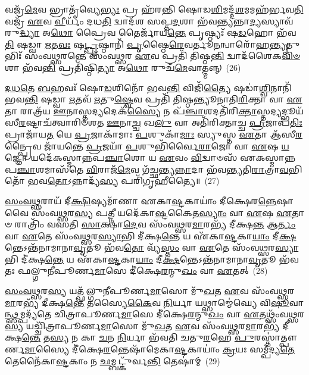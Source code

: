 𑌵𑌜𑍍𑌰᳴\-\ul{𑌮𑍇}\-𑌵 𑌭𑍍𑌰𑌾𑌤𑍃᳴𑌵𑍍𑌯𑍇\-\ul{𑌭𑍍𑌯𑌃} 𑌪𑍍𑌰 𑌹᳴𑌰𑌨𑍍𑌤𑌿 𑌷𑍋𑌡\-\ul{𑌶𑌿}\-𑌮𑌦𑍍𑌦᳴\-\ul{𑌶}\-𑌮𑌮𑌹᳴𑌰𑍍𑌭𑌵\-\ul{𑌤𑌿} 𑌵𑌜𑍍𑌰᳴ \ul{𑌏}\-𑌵 \ul{𑌵𑍀}\-𑌰𑍍𑌯𑌂᳴ 𑌦𑌧\-\ul{𑌤𑌿} 𑌦𑍍𑌵𑌾𑌦᳴𑌶 𑌸𑌪𑍍𑌤\-\ul{𑌦}\-𑌶𑌾 𑌭᳴𑌵\-\ul{𑌨𑍍𑌤𑍍𑌯}\-𑌨𑍍𑌨𑌾\-\ul{𑌦𑍍𑌯}\-𑌸𑍍𑌯𑌾𑌵᳴𑌰𑍁\-\ul{𑌦𑍍𑌧𑍍𑌯𑌾} 𑌅\-\ul{𑌥𑍋} 𑌪𑍍𑌰𑍈𑌵 𑌤𑍈𑌰𑍍𑌜𑌾᳴𑌯\-\ul{𑌨𑍍𑌤𑍇} 𑌪𑍃𑌷𑍍𑌠𑍍𑌯𑌃᳴ 𑌷\-\ul{𑌡}\-𑌹𑍋 𑌭᳴𑌵\-\ul{𑌤𑌿} 𑌷𑌡𑍍𑌵𑌾 \ul{𑌋}\-𑌤\-\ul{𑌵𑌃} 𑌷\-\ul{𑌟𑍍𑌪𑍃}\-𑌷𑍍𑌠𑌾𑌨𑌿᳴ \ul{𑌪𑍃}\-𑌷𑍍𑌠𑍈\-\ul{𑌰𑍇}\-𑌵𑌰𑍍𑌤𑍂\-\ul{𑌨}\-𑌨𑍍𑌵𑌾𑌰𑍋᳴𑌹\-\ul{𑌨𑍍𑌤𑍍𑌯𑍃}\-𑌤𑍁𑌭𑌿𑌃᳴ 𑌸𑌂𑌵\-\ul{𑌥𑍍𑌸}\-𑌰𑌨𑍍𑌤𑍇 𑌸𑌂᳴𑌵\-\ul{𑌥𑍍𑌸}\-𑌰 \ul{𑌏}\-𑌵 𑌪𑍍𑌰𑌤𑌿᳴ 𑌤𑌿𑌷𑍍𑌠\-\ul{𑌨𑍍𑌤𑌿} 𑌦𑍍𑌵𑌾𑌦᳴𑌶𑍈𑌕\-\ul{𑌵𑌿}\-\-\ul{𑍞}\-𑌶𑌾 𑌭᳴𑌵\-\ul{𑌨𑍍𑌤𑌿} 𑌪𑍍𑌰𑌤𑌿᳴𑌷𑍍𑌠𑌿\-\ul{𑌤𑍍𑌯𑌾} 𑌅\-\ul{𑌥𑍋} 𑌰𑍁𑌚᳴\-\ul{𑌮𑍇}\-𑌵𑌾𑌤𑍍𑌮𑌨𑍍𑌨𑍍~(26)

\-\ul{𑌦}\-\-\ul{𑌧}\-\-\ul{𑌤𑍇} \ul{𑌬}\-𑌹𑌵𑌃᳴ 𑌷𑍋\-\ul{𑌡}\-𑌶𑌿𑌨𑍋᳴ 𑌭𑌵\-\ul{𑌨𑍍𑌤𑌿} 𑌵𑌿𑌜𑌿᳴\-\ul{𑌤𑍍𑌯𑍈} 𑌷𑌡𑌾॑\-\ul{𑌶𑍍𑌵𑌿}\-𑌨𑌾𑌨𑌿᳴ 𑌭𑌵\-\ul{𑌨𑍍𑌤𑌿} 𑌷𑌡𑍍𑌵𑌾 \ul{𑌋}\-𑌤𑌵᳴ \ul{𑌋}\-𑌤𑍁\-\ul{𑌷𑍍𑌵𑍇}\-𑌵 𑌪𑍍𑌰𑌤𑌿᳴ 𑌤𑌿𑌷𑍍𑌠𑌨𑍍𑌤𑍍𑌯𑍂𑌨𑌾𑌤𑌿\-\ul{𑌰𑌿}\-𑌕𑍍𑌤𑌾 𑌵𑌾 \ul{𑌏}\-𑌤𑌾 𑌰𑌾𑌤𑍍𑌰᳴𑌯 \ul{𑌊}\-𑌨𑌾𑌸𑍍𑌤𑌦𑍍𑌯𑌦𑍇𑌕᳴\-\ul{𑌸𑍍𑌯𑍈} 𑌨 𑌪᳴\-\ul{𑌞𑍍𑌚𑌾}\-𑌶𑌦𑌤𑌿᳴𑌰𑌿\-\ul{𑌕𑍍𑌤𑌾}\-𑌸𑍍𑌤𑌦𑍍𑌯𑌦𑍍𑌭𑍂𑌯᳴𑌸𑍀\-\ul{𑌰}\-𑌷𑍍𑌟𑌾𑌚᳴𑌤𑍍𑌵𑌾𑌰𑌿𑍞𑌶𑌤 \ul{𑌊}\-𑌨𑌾\-\ul{𑌚𑍍𑌚} 𑌖\-\ul{𑌲𑍁} 𑌵𑌾 𑌅𑌤𑌿᳴𑌰𑌿𑌕𑍍𑌤𑌾𑌚𑍍𑌚 \ul{𑌪𑍍𑌰}\-𑌜𑌾𑌪᳴\-\ul{𑌤𑌿𑌃} 𑌪𑍍𑌰𑌾𑌜𑌾᳴𑌯\-\ul{𑌤} 𑌯𑍇 \ul{𑌪𑍍𑌰}\-𑌜𑌾𑌕𑌾᳴𑌮𑌾𑌃 \ul{𑌪}\-𑌶𑍁𑌕𑌾᳴\-\ul{𑌮𑌾𑌃} 𑌸𑍍𑌯𑍁𑌸𑍍𑌤 \ul{𑌏}\-𑌤𑌾 𑌆᳴𑌸𑍀\-\ul{𑌰}\-𑌨𑍍𑌪𑍍𑌰𑍈𑌵 𑌜𑌾᳴𑌯𑌨𑍍𑌤𑍇 \ul{𑌪𑍍𑌰}\-𑌜𑌯𑌾᳴ \ul{𑌪}\-𑌶𑍁𑌭𑌿᳴𑌰𑍍𑌵𑍈\-\ul{𑌰𑌾}\-𑌜𑍋 𑌵𑌾 \ul{𑌏}\-𑌷 \ul{𑌯}\-𑌜𑍍𑌞𑍋 𑌯𑌦𑍇᳴𑌕𑌸𑍍𑌮𑌾𑌨𑍍𑌨𑌪\-\ul{𑌞𑍍𑌚𑌾}\-𑌶𑍋 𑌯 \ul{𑌏}\-𑌵𑌂 \ul{𑌵𑌿}\-𑌦𑍍𑌵𑌾𑍞𑌸᳴ 𑌏𑌕𑌸𑍍𑌮𑌾𑌨𑍍𑌨𑌪\-\ul{𑌞𑍍𑌚𑌾}\-𑌶𑌮𑌾𑌸᳴𑌤𑍇 \ul{𑌵𑌿}\-𑌰𑌾𑌜᳴\-\ul{𑌮𑍇}\-𑌵 𑌗᳴𑌚𑍍𑌛𑌨𑍍𑌤𑍍𑌯\-\ul{𑌨𑍍𑌨𑌾}\-𑌦𑌾 𑌭᳴𑌵𑌨𑍍𑌤𑍍𑌯𑌤𑌿\-\ul{𑌰𑌾}\-𑌤𑍍𑌰𑌾\-\ul{𑌵}\-𑌭𑌿𑌤𑍋᳴ 𑌭𑌵\-\ul{𑌤𑍋}\-\-𑌽𑌨𑍍𑌨𑌾𑌦𑍍𑌯᳴\-\ul{𑌸𑍍𑌯} 𑌪𑌰𑌿᳴𑌗𑍃𑌹𑍀𑌤𑍍𑌯𑍈॥~(27)

{\anuvakamend[{𑌵𑌜𑍍𑌰᳴ \ul{𑌆}\-𑌤𑍍𑌮\-\ul{𑌨𑍍𑌪𑍍𑌰}\-𑌜\-\ul{𑌯𑌾} 𑌦𑍍𑌵𑌾𑌵𑌿𑍞᳴𑌶𑌤𑌿𑌶𑍍𑌚}]}%

\-\ul{𑌸𑌂}\-\-\ul{𑌵}\-\-\ul{𑌥𑍍𑌸}\-𑌰𑌾𑌯᳴ 𑌦𑍀\-\ul{𑌕𑍍𑌷𑌿}\-𑌷𑍍𑌯𑌮𑌾᳴𑌣𑌾 𑌏𑌕𑌾\-\ul{𑌷𑍍𑌟}\-𑌕𑌾𑌯𑌾𑌂॑ 𑌦𑍀𑌕𑍍𑌷𑍇𑌰\-\ul{𑌨𑍍𑌨𑍇}\-𑌷𑌾 𑌵𑍈 𑌸𑌂᳴𑌵\-\ul{𑌥𑍍𑌸}\-𑌰\-\ul{𑌸𑍍𑌯} 𑌪\-\ul{𑌤𑍍𑌨𑍀} 𑌯𑌦𑍇᳴𑌕𑌾\-\ul{𑌷𑍍𑌟}\-𑌕𑍈𑌤\-\ul{𑌸𑍍𑌯𑌾𑌂} 𑌵𑌾 \ul{𑌏}\-𑌷 \ul{𑌏}\-𑌤𑌾𑍞 𑌰𑌾𑌤𑍍𑌰𑌿𑌂᳴ 𑌵𑌸𑌤𑌿 \ul{𑌸𑌾}\-𑌕𑍍𑌷𑌾\-\ul{𑌦𑍇}\-𑌵 𑌸𑌂᳴𑌵\-\ul{𑌥𑍍𑌸}\-𑌰\-\ul{𑌮𑌾}\-𑌰𑌭𑍍𑌯᳴ 𑌦𑍀𑌕𑍍𑌷\-\ul{𑌨𑍍𑌤} 𑌆\-\ul{𑌰𑍍𑌤𑌂} 𑌵𑌾 \ul{𑌏}\-𑌤𑍇 𑌸𑌂᳴𑌵\-\ul{𑌥𑍍𑌸}\-𑌰\-\ul{𑌸𑍍𑌯𑌾}\-𑌭𑌿 𑌦𑍀॑𑌕𑍍𑌷\-\ul{𑌨𑍍𑌤𑍇} 𑌯 𑌏᳴𑌕𑌾\-\ul{𑌷𑍍𑌟}\-𑌕𑌾\-\ul{𑌯𑌾𑌂} 𑌦𑍀\-\ul{𑌕𑍍𑌷}\-𑌨𑍍𑌤𑍇\-𑌽𑌨𑍍𑌤᳴𑌨𑌾𑌮𑌾𑌨𑌾\-\ul{𑌵𑍃}\-𑌤𑍂 𑌭᳴𑌵\-\ul{𑌤𑍋} 𑌵𑍍𑌯᳴\-\ul{𑌸𑍍𑌤𑌂} 𑌵𑌾 \ul{𑌏}\-𑌤𑍇 𑌸𑌂᳴𑌵\-\ul{𑌥𑍍𑌸}\-𑌰\-\ul{𑌸𑍍𑌯𑌾}\-𑌭𑌿 𑌦𑍀॑𑌕𑍍𑌷\-\ul{𑌨𑍍𑌤𑍇} 𑌯 𑌏᳴𑌕𑌾\-\ul{𑌷𑍍𑌟}\-𑌕𑌾\-\ul{𑌯𑌾𑌂} 𑌦𑍀\-\ul{𑌕𑍍𑌷}\-𑌨𑍍𑌤𑍇\-𑌽𑌨𑍍𑌤᳴𑌨𑌾𑌮𑌾𑌨𑌾\-\ul{𑌵𑍃}\-𑌤𑍂 𑌭᳴𑌵𑌤𑌃 𑌫𑌲𑍍𑌗𑍁𑌨𑍀𑌪𑍂𑌰𑍍𑌣\-\ul{𑌮𑌾}\-𑌸𑍇 𑌦𑍀॑𑌕𑍍𑌷𑍇\-\ul{𑌰}\-𑌨𑍍𑌮𑍁\-\ul{𑌖𑌂} 𑌵𑌾 \ul{𑌏}\-𑌤𑌤𑍍~(28)

\-\ul{𑌸𑌂}\-\-\ul{𑌵}\-\-\ul{𑌥𑍍𑌸}\-𑌰\-\ul{𑌸𑍍𑌯} 𑌯𑌤𑍍𑌫᳴𑌲𑍍𑌗𑍁𑌨𑍀𑌪𑍂𑌰𑍍𑌣\-\ul{𑌮𑌾}\-𑌸𑍋 𑌮𑍁᳴\-\ul{𑌖}\-𑌤 \ul{𑌏}\-𑌵 𑌸𑌂᳴𑌵\-\ul{𑌥𑍍𑌸}\-𑌰\-\ul{𑌮𑌾}\-𑌰𑌭𑍍𑌯᳴ 𑌦𑍀𑌕𑍍𑌷\-\ul{𑌨𑍍𑌤𑍇} 𑌤𑌸𑍍𑌯𑍈\-\ul{𑌕𑍈}\-𑌵 \ul{𑌨𑌿}\-𑌰𑍍𑌯𑌾 𑌯𑌥𑍍𑌸𑌾𑌮𑍍𑌮𑍇॑𑌘𑍍𑌯𑍇 𑌵𑌿\-\ul{𑌷𑍂}\-𑌵𑌾\-\ul{𑌨𑍍𑌥𑍍𑌸}\-𑌮𑍍𑌪𑌦𑍍𑌯᳴𑌤𑍇 𑌚𑌿𑌤𑍍𑌰𑌾𑌪𑍂𑌰𑍍𑌣\-\ul{𑌮𑌾}\-𑌸𑍇 𑌦𑍀॑𑌕𑍍𑌷𑍇\-\ul{𑌰}\-𑌨𑍍𑌮𑍁\-\ul{𑌖𑌂} 𑌵𑌾 \ul{𑌏}\-𑌤𑌥𑍍𑌸𑌂᳴𑌵\-\ul{𑌥𑍍𑌸}\-𑌰\-\ul{𑌸𑍍𑌯} 𑌯𑌚𑍍𑌚𑌿᳴𑌤𑍍𑌰𑌾𑌪𑍂𑌰𑍍𑌣\-\ul{𑌮𑌾}\-𑌸𑍋 𑌮𑍁᳴\-\ul{𑌖}\-𑌤 \ul{𑌏}\-𑌵 𑌸𑌂᳴𑌵\-\ul{𑌥𑍍𑌸}\-𑌰\-\ul{𑌮𑌾}\-𑌰𑌭𑍍𑌯᳴ 𑌦𑍀𑌕𑍍𑌷\-\ul{𑌨𑍍𑌤𑍇} 𑌤\-\ul{𑌸𑍍𑌯} 𑌨 𑌕𑌾 \ul{𑌚}\-𑌨 \ul{𑌨𑌿}\-𑌰𑍍𑌯𑌾 𑌭᳴𑌵𑌤𑌿 𑌚𑌤𑍁\-\ul{𑌰}\-𑌹𑍇 \ul{𑌪𑍁}\-𑌰𑌸𑍍𑌤𑌾॑𑌤𑍍𑌪𑍗𑌰𑍍𑌣\-\ul{𑌮𑌾}\-𑌸𑍍𑌯𑍈 𑌦𑍀॑𑌕𑍍𑌷𑍇\-\ul{𑌰}\-𑌨𑍍𑌤𑍇𑌷𑌾᳴𑌮𑍇𑌕𑌾\-\ul{𑌷𑍍𑌟}\-𑌕𑌾𑌯𑌾𑌂॑ \ul{𑌕𑍍𑌰}\-𑌯𑌃 𑌸𑌮𑍍𑌪᳴𑌦𑍍𑌯\-\ul{𑌤𑍇} 𑌤𑍇𑌨𑍈᳴𑌕𑌾\-\ul{𑌷𑍍𑌟}\-𑌕𑌾𑌂 𑌨 \ul{𑌛}\-𑌮𑍍𑌬𑌟𑍍𑌕𑍁᳴𑌰𑍍𑌵\-\ul{𑌨𑍍𑌤𑌿} 𑌤𑍇𑌷𑌾॑𑌮𑍍~(29)

